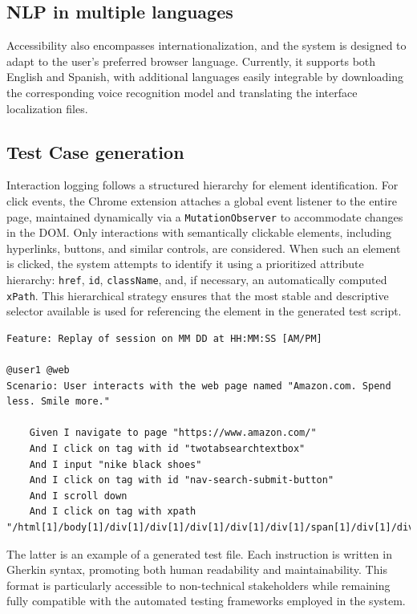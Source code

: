 \subsection{NLP in multiple languages}
Accessibility also encompasses internationalization, and the system is designed to adapt to the user's preferred browser language. Currently, it supports both English and Spanish, with additional languages easily integrable by downloading the corresponding voice recognition model and translating the interface localization files.

\subsection{Test Case generation}

Interaction logging follows a structured hierarchy for element identification. For click events, the Chrome extension attaches a global event listener to the entire page, maintained dynamically via a \verb|MutationObserver| to accommodate changes in the DOM. Only interactions with semantically clickable elements, including hyperlinks, buttons, and similar controls, are considered. When such an element is clicked, the system attempts to identify it using a prioritized attribute hierarchy: \verb|href|, \verb|id|, \verb|className|, and, if necessary, an automatically computed \verb|xPath|. This hierarchical strategy ensures that the most stable and descriptive selector available is used for referencing the element in the generated test script.


\begin{lstlisting}
Feature: Replay of session on MM DD at HH:MM:SS [AM/PM]

@user1 @web
Scenario: User interacts with the web page named "Amazon.com. Spend less. Smile more."

    Given I navigate to page "https://www.amazon.com/"
    And I click on tag with id "twotabsearchtextbox"
    And I input "nike black shoes"
    And I click on tag with id "nav-search-submit-button"
    And I scroll down
    And I click on tag with xpath "/html[1]/body[1]/div[1]/div[1]/div[1]/div[1]/div[1]/span[1]/div[1]/div[9]/div[1]/div[1]/span[1]/div[1]/div[1]/div[1]/span[1]/a[1]/div[1]"
\end{lstlisting}

The latter is an example of a generated test file. Each instruction is written in Gherkin syntax, promoting both human readability and maintainability. This format is particularly accessible to non-technical stakeholders while remaining fully compatible with the automated testing frameworks employed in the system.

